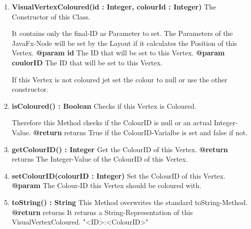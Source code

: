 				\begin{enumerate}[+]
					\item{
						\textbf{VisualVertexColoured(id : Integer, colourId : Integer)} \newline
						The Constructor of this Class.
						
						It contains only the final-ID as Parameter to set.
						The Parameters of the JavaFx-Node will be set by the Layout if it calculates the Position of this Vertex.
						\newline
						\textbf{@param id}
							The ID that will be set to this Vertex.
							\newline
						\textbf{@param coulorID}
							The ID that will be set to this Vertex.
							
							If this Vertex is not coloured jet set the colour to null or use the other constructor.
							\newline
					}
					\item{
						\textbf{isColoured() : Boolean} \newline
						Checks if this Vertex is Coloured.
						
						Therefore this Method checks if the ColourID is null or an actual Integer-Value.
						\newline
						\textbf{@return} returns
							True if the ColourID-Varialbe is set and false if not.
							\newline
					}
					\item{
						\textbf{getColourID() : Integer} \newline
						Get the ColourID of this Vertex.
						\newline
						\textbf{@return} returns
							The Integer-Value of the ColourID of this Vertex.
							\newline
					}
					\item{
						\textbf{setColourID(colourID : Integer)} \newline
						Set the ColourID of this Vertex.
						\newline
						\textbf{@param}
							The Colour-ID this Vertex should be coloured with.
							\newline
					}
					\item{
						\textbf{toString() : String} \newline
						This Method overwrites the standard toString-Method.
						\newline
						\textbf{@return} returns
							It returns a String-Representation of this VisualVertexColoured.
							"<ID>:<ColourID>"
							\newline
					}
				\end{enumerate}	
			
